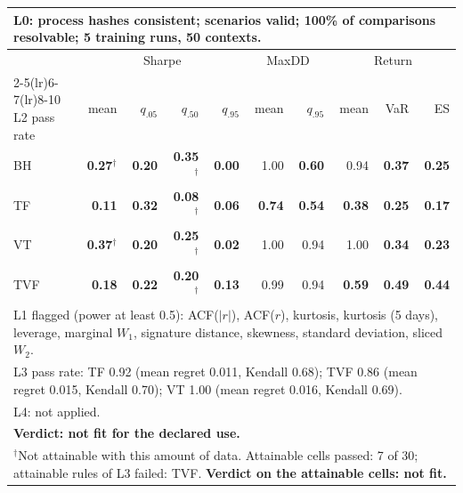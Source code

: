 \begin{tabular}{lrrrrrrrrr}
\toprule
\multicolumn{10}{p{13.5cm}}{L0: process hashes consistent; scenarios valid; 100\% of comparisons resolvable; 5 training runs, 50 contexts.} \\
\midrule
 & \multicolumn{4}{c}{Sharpe} & \multicolumn{2}{c}{MaxDD} & \multicolumn{3}{c}{Return} \\
\cmidrule(lr){2-5}\cmidrule(lr){6-7}\cmidrule(lr){8-10}
L2 pass rate & mean & $q_{.05}$ & $q_{.50}$ & $q_{.95}$ & mean & $q_{.95}$ & mean & VaR & ES \\
\midrule
BH & \textbf{0.27}$^{\dagger}$ & \textbf{0.20} & \textbf{0.35}$^{\dagger}$ & \textbf{0.00} & 1.00 & \textbf{0.60} & 0.94 & \textbf{0.37} & \textbf{0.25} \\
TF & \textbf{0.11} & \textbf{0.32} & \textbf{0.08}$^{\dagger}$ & \textbf{0.06} & \textbf{0.74} & \textbf{0.54} & \textbf{0.38} & \textbf{0.25} & \textbf{0.17} \\
VT & \textbf{0.37}$^{\dagger}$ & \textbf{0.20} & \textbf{0.25}$^{\dagger}$ & \textbf{0.02} & 1.00 & 0.94 & 1.00 & \textbf{0.34} & \textbf{0.23} \\
TVF & \textbf{0.18} & \textbf{0.22} & \textbf{0.20}$^{\dagger}$ & \textbf{0.13} & 0.99 & 0.94 & \textbf{0.59} & \textbf{0.49} & \textbf{0.44} \\
\midrule
\multicolumn{10}{p{13.5cm}}{L1 flagged (power at least 0.5): ACF($|r|$), ACF($r$), kurtosis, kurtosis (5 days), leverage, marginal $W_1$, signature distance, skewness, standard deviation, sliced $W_2$.} \\
\multicolumn{10}{p{13.5cm}}{L3 pass rate: TF 0.92 (mean regret 0.011, Kendall 0.68); TVF 0.86 (mean regret 0.015, Kendall 0.70); VT 1.00 (mean regret 0.016, Kendall 0.69).} \\
\multicolumn{10}{p{13.5cm}}{L4: not applied.} \\
\multicolumn{10}{p{13.5cm}}{\textbf{Verdict: not fit for the declared use.}} \\
\multicolumn{10}{p{13.5cm}}{$^{\dagger}$Not attainable with this amount of data. Attainable cells passed: 7 of 30; attainable rules of L3 failed: TVF. \textbf{Verdict on the attainable cells: not fit.}} \\
\bottomrule
\end{tabular}
